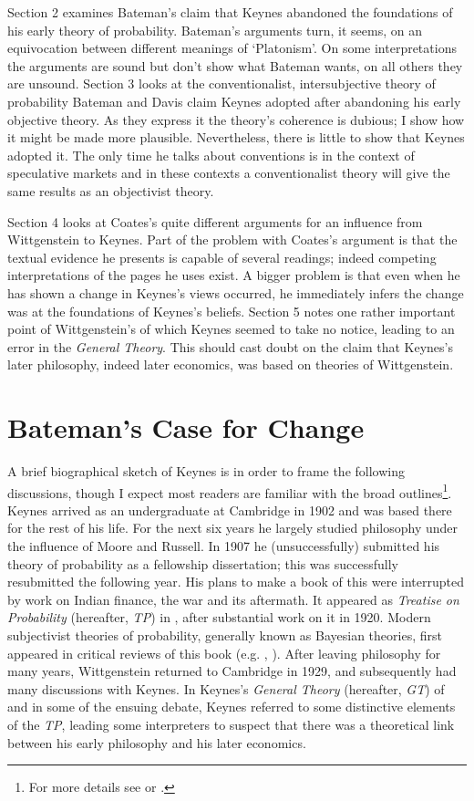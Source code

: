Section 2 examines Bateman's claim that Keynes abandoned the foundations of his early theory of probability. Bateman's arguments turn, it seems, on an equivocation between different meanings of `Platonism'. On some interpretations the arguments are sound but don't show what Bateman wants, on all others they are unsound. Section 3 looks at the conventionalist, intersubjective theory of probability Bateman and Davis claim Keynes adopted after abandoning his early objective theory. As they express it the theory's coherence is dubious; I show how it might be made more plausible. Nevertheless, there is little to show that Keynes adopted it. The only time he talks about conventions is in the context of speculative markets and in these contexts a conventionalist theory will give the same results as an objectivist theory.

Section 4 looks at Coates's quite different arguments for an influence from Wittgenstein to Keynes. Part of the problem with Coates's argument is that the textual evidence he presents is capable of several readings; indeed competing interpretations of the pages he uses exist. A bigger problem is that even when he has shown a change in Keynes's views occurred, he immediately infers the change was at the foundations of Keynes's beliefs. Section 5 notes one rather important point of Wittgenstein's of which Keynes seemed to take no notice, leading to an error in the \textit{General Theory}. This should cast doubt on the claim that Keynes's later philosophy, indeed later economics, was based on theories of Wittgenstein.

\section{Bateman's Case for Change}

A brief biographical sketch of Keynes is in order to frame the following discussions, though I expect most readers are familiar with the broad outlines\footnote{For more details see \citet{Skidelsky1983, Skidelsky1992} or \citet{Moggridge1992}.}. Keynes arrived as an undergraduate at Cambridge in 1902 and was based there for the rest of his life. For the next six years he largely studied philosophy under the influence of Moore and Russell. In 1907 he (unsuccessfully) submitted his theory of probability as a fellowship dissertation; this was successfully resubmitted the following year. His plans to make a book of this were interrupted by work on Indian finance, the war and its aftermath. It appeared as \textit{Treatise on Probability }(hereafter, \textit{TP}) in \citeyear{Keynes1921}, after substantial work on it in 1920. Modern subjectivist theories of probability, generally known as Bayesian theories, first appeared in critical reviews of this book (e.g. \citet{Borel1924}, \citet{RamseyTruthProb}). After leaving philosophy for many years, Wittgenstein returned to Cambridge in 1929, and subsequently had many discussions with Keynes. In Keynes's \textit{General Theory} (hereafter, \textit{GT}) of \citeyear{Keynes1936} and in some of the ensuing debate, Keynes referred to some distinctive elements of the \textit{TP}, leading some interpreters to suspect that there was a theoretical link between his early philosophy and his later economics.

